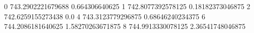 0 743.2902221679688 0.664306640625
1 742.8077392578125 0.18182373046875
2 742.6259155273438 0.0
4 743.3123779296875 0.68646240234375
6 744.2086181640625 1.58270263671875
8 744.9913330078125 2.36541748046875
